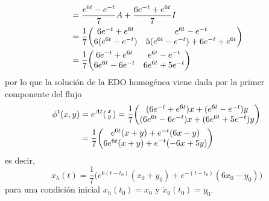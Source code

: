 \begin{sol}
\begin{enumerate}[leftmargin=*, label=(\alph*)]
\begin{align*}
&= \frac{e^{6t} - e^{-t}}{7} A + \frac{6e^{-t}  + e^{6t}}{7}I\\
&= \frac17\mqty(%
    6e^{-t}  + e^{6t}  & e^{6t} - e^{-t}\\
    6(e^{6t} - e^{-t}) & 5(e^{6t} - e^{-t}) + 6e^{-t}  + e^{6t}
)\\
&= \frac17\mqty(%
    6e^{-t}  + e^{6t} & e^{6t} - e^{-t}\\
    6e^{6t} - 6e^{-t} & 6e^{6t} + 5e^{-t}
)
\end{align*}
por lo que la solución de la EDO homogénea viene dada por la primer componente del flujo
\begin{align*}
\phi^t(x,y)%
&= e^{At}\smqty(x\\y) = \frac17\mqty( (6e^{-t}  + e^{6t})x + (e^{6t} - e^{-t})y \\ (6e^{6t} - 6e^{-t})x + (6e^{6t} + 5e^{-t})y )\\
&= \frac17\mqty(e^{6t}(x+y) + e^{-t}(6x-y)\\6e^{6t}(x+y) + e^{-t}(-6x + 5y))
\end{align*}
es decir, 
\[
x_h(t) = \frac17\big( e^{6(t-t_0)}(x_0+y_0) + e^{-(t-t_0)}(6x_0-y_0) \big)
\] 
para una condición inicial $x_h(t_0) = x_0$ y $\dot{x}_0(t_0) = y_0$.\par\vspace{1em}


\end{enumerate}
\end{sol}
